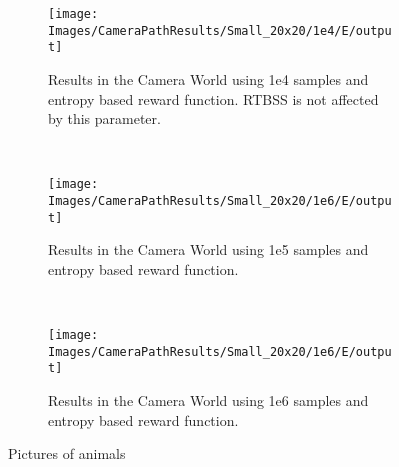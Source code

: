 \begin{figure}[h]
        \centering
        \begin{subfigure}[t]{0.3\textwidth}
                \texttt{[image: Images/CameraPathResults/Small\_20x20/1e4/E/output]}
                \caption{Results in the Camera World using 1e4 samples and entropy based reward
                function. RTBSS is not affected by this parameter.}
                \label{fig:m4e}
        \end{subfigure}%
        ~ %
        \begin{subfigure}[t]{0.3\textwidth}
                \texttt{[image: Images/CameraPathResults/Small\_20x20/1e6/E/output]}
                \caption{Results in the Camera World using 1e5 samples and entropy based reward
                function.}
                \label{fig:m5e}
        \end{subfigure}
        ~ %
        \begin{subfigure}[t]{0.3\textwidth}
                \texttt{[image: Images/CameraPathResults/Small\_20x20/1e6/E/output]}
                \caption{Results in the Camera World using 1e6 samples and entropy based reward
                function.}
                \label{fig:m6e}
        \end{subfigure}
        \caption{Pictures of animals}\label{fig:me}
\end{figure}

